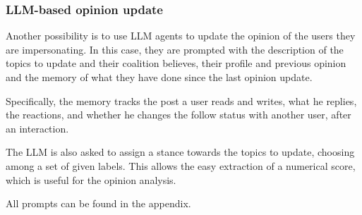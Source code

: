 \subsubsection{LLM-based opinion update}
Another possibility is to use LLM agents to update the opinion of the users they are impersonating.
In this case, they are prompted with the description of the topics to update and their coalition believes, their profile and previous opinion and the memory of what they have done since the last opinion update.

Specifically, the memory tracks the post a user reads and writes, what he replies, the reactions, and whether he changes the follow status with another user, after an interaction. 

The LLM is also asked to assign a stance towards the topics to update, choosing among a set of given labels. This allows the easy extraction of a numerical score, which is useful for the opinion analysis.

All prompts can be found in the appendix.